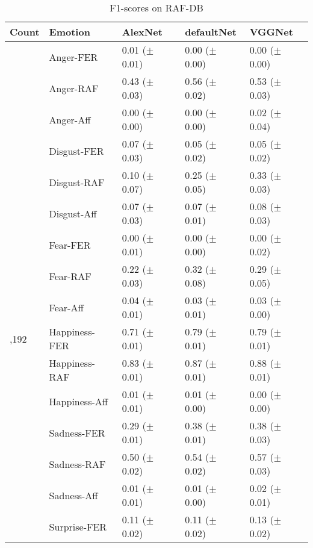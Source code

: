 \documentclass[a4paper, conference]{IEEEtran}
\begin{document}
\begin{table}[htbp]
	\caption{F1-scores on RAF-DB}
	\begin{center}
		\begin{tabular}{>{\raggedleft\arraybackslash}p{0.7cm}p{1.82cm}p{1.55cm}p{1.55cm}p{1.55cm}@{}} %
			\hline
			\hline %
			Count & Emotion & AlexNet & defaultNet & VGGNet \\
			\hline
			\hline
			173 & Anger-FER & 0.01 ($\pm$ 0.01) & 0.00 ($\pm$ 0.00) & 0.00 ($\pm$ 0.00) \\
			    & Anger-RAF & 0.43 ($\pm$ 0.03) & 0.56 ($\pm$ 0.02) & 0.53 ($\pm$ 0.03) \\
			    & Anger-Aff & 0.00 ($\pm$ 0.00) & 0.00 ($\pm$ 0.00) & 0.02 ($\pm$ 0.04) \\
			\hline %
			175 & Disgust-FER & 0.07 ($\pm$ 0.03) & 0.05 ($\pm$ 0.02) & 0.05 ($\pm$ 0.02) \\
			    & Disgust-RAF & 0.10 ($\pm$ 0.07) & 0.25 ($\pm$ 0.05) & 0.33 ($\pm$ 0.03) \\
			    & Disgust-Aff & 0.07 ($\pm$ 0.03) & 0.07 ($\pm$ 0.01) & 0.08 ($\pm$ 0.03) \\
			\hline %
			71 & Fear-FER & 0.00 ($\pm$ 0.01) & 0.00 ($\pm$ 0.00) & 0.00 ($\pm$ 0.02) \\
			   & Fear-RAF & 0.22 ($\pm$ 0.03) & 0.32 ($\pm$ 0.08) & 0.29 ($\pm$ 0.05) \\
			   & Fear-Aff & 0.04 ($\pm$ 0.01) & 0.03 ($\pm$ 0.01) & 0.03 ($\pm$ 0.00) \\
			\hline %
			1,192 & Happiness-FER & 0.71 ($\pm$ 0.01) & 0.79 ($\pm$ 0.01) & 0.79 ($\pm$ 0.01) \\
			      & Happiness-RAF & 0.83 ($\pm$ 0.01) & 0.87 ($\pm$ 0.01) & 0.88 ($\pm$ 0.01) \\
			      & Happiness-Aff & 0.01 ($\pm$ 0.01) & 0.01 ($\pm$ 0.00) & 0.00 ($\pm$ 0.00) \\
			\hline %
			492 & Sadness-FER & 0.29 ($\pm$ 0.01) & 0.38 ($\pm$ 0.01) & 0.38 ($\pm$ 0.03) \\
			    & Sadness-RAF & 0.50 ($\pm$ 0.02) & 0.54 ($\pm$ 0.02) & 0.57 ($\pm$ 0.03) \\
			    & Sadness-Aff & 0.01 ($\pm$ 0.01) & 0.01 ($\pm$ 0.00) & 0.02 ($\pm$ 0.01) \\
			\hline %
			324 & Surprise-FER & 0.11 ($\pm$ 0.02) & 0.11 ($\pm$ 0.02) & 0.13 ($\pm$ 0.02) \\

\end{tabular}
\end{center}
\end{table}
\end{document}
